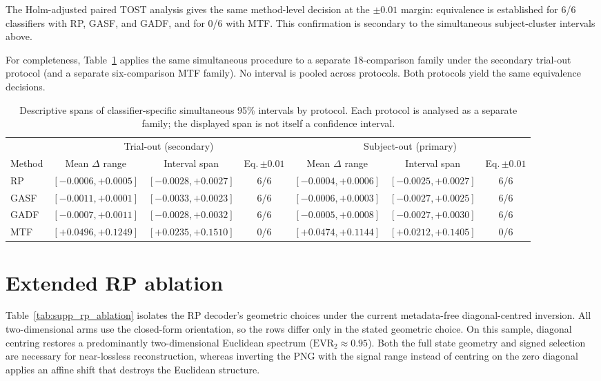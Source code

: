 \documentclass[10pt,a4paper,parskip=half-]{scrartcl}
\begin{document}
The Holm-adjusted paired TOST analysis gives the same method-level decision at the $\pm0.01$ margin: equivalence is established for 6/6 classifiers with RP, GASF, and GADF, and for 0/6 with MTF. This confirmation is secondary to the simultaneous subject-cluster intervals above.

For completeness, Table~\ref{tab:supp_equivalence_protocols} applies the same simultaneous procedure to a separate 18-comparison family under the secondary trial-out protocol (and a separate six-comparison MTF family). No interval is pooled across protocols. Both protocols yield the same equivalence decisions.

\begin{table}[H]
\centering
\caption{Descriptive spans of classifier-specific simultaneous 95\% intervals by protocol. Each protocol is analysed as a separate family; the displayed span is not itself a confidence interval.}
\label{tab:supp_equivalence_protocols}
\small
\setlength{\tabcolsep}{4pt}
\begin{tabular}{lccc ccc}
\toprule
 & \multicolumn{3}{c}{Trial-out (secondary)} & \multicolumn{3}{c}{Subject-out (primary)} \\
\cmidrule(lr){2-4}\cmidrule(lr){5-7}
Method & Mean $\Delta$ range & Interval span & Eq.\,$\pm0.01$ & Mean $\Delta$ range & Interval span & Eq.\,$\pm0.01$ \\
\midrule
RP   & $[-0.0006,+0.0005]$ & $[-0.0028,+0.0027]$ & 6/6 & $[-0.0004,+0.0006]$ & $[-0.0025,+0.0027]$ & 6/6 \\
GASF & $[-0.0011,+0.0001]$ & $[-0.0033,+0.0023]$ & 6/6 & $[-0.0006,+0.0003]$ & $[-0.0027,+0.0025]$ & 6/6 \\
GADF & $[-0.0007,+0.0011]$ & $[-0.0028,+0.0032]$ & 6/6 & $[-0.0005,+0.0008]$ & $[-0.0027,+0.0030]$ & 6/6 \\
MTF  & $[+0.0496,+0.1249]$ & $[+0.0235,+0.1510]$ & 0/6 & $[+0.0474,+0.1144]$ & $[+0.0212,+0.1405]$ & 0/6 \\
\bottomrule
\end{tabular}
\end{table}

\section{Extended RP ablation}

Table~\ref{tab:supp_rp_ablation} isolates the RP decoder's geometric choices under the current metadata-free diagonal-centred inversion. All two-dimensional arms use the closed-form orientation, so the rows differ only in the stated geometric choice. On this sample, diagonal centring restores a predominantly two-dimensional Euclidean spectrum ($\mathrm{EVR}_2\approx0.95$). Both the full state geometry and signed selection are necessary for near-lossless reconstruction, whereas inverting the PNG with the signal range instead of centring on the zero diagonal applies an affine shift that destroys the Euclidean structure.
\end{document}
